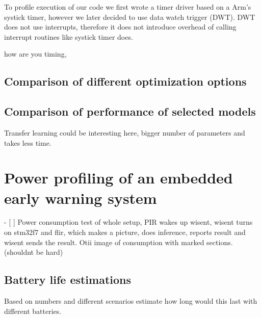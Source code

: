 To profile execution of our code we first wrote a timer driver based on a Arm's systick timer, however we later decided to use data watch trigger (DWT).
DWT does not use interrupts, therefore it does not introduce overhead of calling interrupt routines like systick timer does.


      how are you timing, 

\subsection{ Comparison of different optimization options}
\subsection{ Comparison of performance of selected models}
    Transfer learning could be interesting here, bigger number of parameters and takes less time.






\section{ Power profiling of an embedded early warning system}
- [ ] Power consumption test of whole setup, 
      PIR wakes up wisent, 
      wisent turns on stm32f7 and flir, 
      which makes a picture, does inference, reports result and wisent sends the result. 
      Otii image of consumption with marked sections.(shouldnt be hard)

\subsection{ Battery life estimations}
Based on numbers and different scenarios estimate how long would this last with different batteries.

